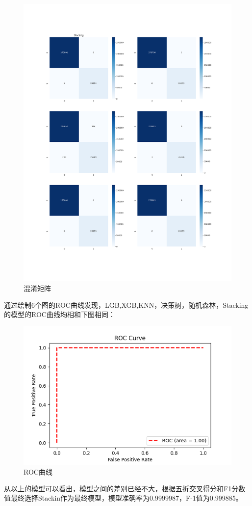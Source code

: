\begin{figure}[H]
	\centering
	\includegraphics[scale=0.3,angle=0]{images/16.png}
	\caption{混淆矩阵}
	\label{16}
\end{figure}


通过绘制6个图的ROC曲线发现，LGB,XGB,KNN，决策树，随机森林，Stacking的模型的ROC曲线均相和下图相同：
\begin{figure}[H]
	\centering
	\includegraphics[scale=0.75,angle=0]{images/17.png}
	\caption{ROC曲线}
	\label{17}
\end{figure}
从以上的模型可以看出，模型之间的差别已经不大，根据五折交叉得分和F1分数值最终选择Stackin作为最终模型，模型准确率为0.9999987，F-1值为0.999885。


